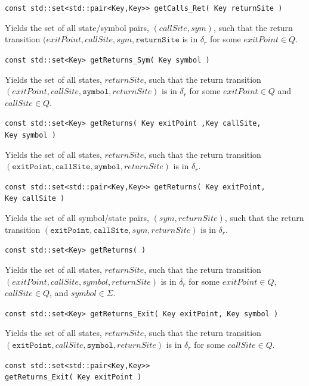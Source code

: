 \documentclass{llncs}
\begin{document}
\begin{description}
  \item\texttt{const std::set<std::pair<Key,Key>> getCalls\_Ret( Key returnSite )} \nopagebreak

    Yields the set of all state/symbol pairs, $(callSite,sym)$, such that the return transition $(exitPoint,callSite,sym,\texttt{returnSite}$ is in $\delta_r$ for some $exitPoint \in Q$.

  \item\texttt{const std::set<Key> getReturns\_Sym( Key symbol )} \nopagebreak

    Yields the set of all states, $returnSite$, such that the return transition $(exitPoint,callSite,\texttt{symbol},returnSite)$ is in $\delta_r$ for some $exitPoint \in Q$ and $callSite \in Q$.

  \item\texttt{const std::set<Key> getReturns( Key exitPoint ,Key callSite,\\ \hspace*{3.25cm} Key symbol )} \nopagebreak

    Yields the set of all states, $returnSite$, such that the return transition $(\texttt{exitPoint},\texttt{callSite},\texttt{symbol},returnSite)$ is in $\delta_r$.

  \item\texttt{const std::set<std::pair<Key,Key>> getReturns( Key exitPoint,\\ \hspace*{3.25cm} Key callSite )} \nopagebreak

    Yields the set of all symbol/state pairs, $(sym,returnSite)$, such that the return transition $(\texttt{exitPoint},\texttt{callSite},sym,returnSite)$ is in $\delta_r$.

  \item\texttt{const std::set<Key> getReturns( )} \nopagebreak

    Yields the set of all states, $returnSite$, such that the return transition $(exitPoint,callSite,symbol,returnSite)$ is in $\delta_r$ for some $exitPoint \in Q$, $callSite \in Q$, and $symbol \in \Sigma$.

  \item\texttt{const std::set<Key> getReturns\_Exit( Key exitPoint, Key symbol )} \nopagebreak

    Yields the set of all states, $returnSite$, such that the return transition $(\texttt{exitPoint},callSite,\texttt{symbol},returnSite)$ is in $\delta_r$ for some $callSite \in Q$.

  \item\texttt{const std::set<std::pair<Key,Key>> \\getReturns\_Exit( Key exitPoint )} \nopagebreak


\end{description}
\end{document}
